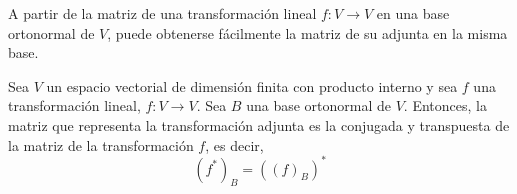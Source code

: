 {






\bigskip

\bigskip


A partir de la matriz de una transformación lineal $f: V \rightarrow V$ en una base ortonormal de $V$, puede obtenerse fácilmente la matriz de su adjunta en la misma base.


\bigskip


\begin{theorem}

Sea $V$ un espacio vectorial de dimensión finita  con producto interno y sea $f$ una transformación lineal, $f: V \rightarrow V$. Sea $B$ una base ortonormal de $V$. Entonces, la matriz que representa la transformación adjunta es la conjugada y transpuesta de la matriz de la transformación $f$, es decir,
\begin{equation}
(f^{*})_B= (( f )_B)^{*}
 \label{240}
\end{equation}




\end{theorem}}

